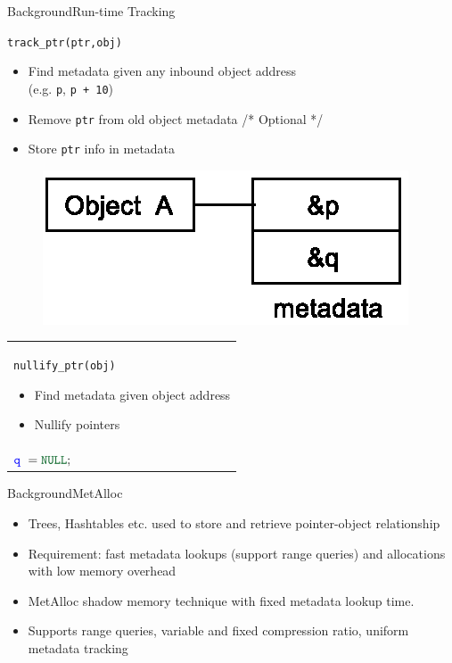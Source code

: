 \documentclass{beamer}
\begin{document}
\begin{frame}{Background}{Run-time Tracking}
\begin{minipage}{0.45\textwidth}
\texttt{\color{red}track\_ptr(ptr,obj)}
\begin{itemize}
\item Find metadata given any inbound object address \\(e.g. \texttt{\color{blue}p}, \texttt{{\color{blue}p} + 10})
\item Remove \texttt{ptr} from old object metadata /* Optional */
\item Store \texttt{ptr} info in metadata
\end{itemize}
\begin{figure}[h]
	\centering
	\includegraphics[scale=0.7]{pointer_tracking.eps} 
\end{figure}
\end{minipage}%
\hfill
\begin{minipage}{0.45\textwidth}
\begin{tabular}{|p{\textwidth}}
\texttt{\color{red}nullify\_ptr(obj)}
\begin{itemize}
\item Find metadata given object address
\item Nullify pointers
%
\end{itemize}
%
\begin{center}
$\texttt{\color{blue}p}\ = \texttt{\textcolor{darkgreen}{NULL}};$ \\
$\texttt{\color{blue}q}\ = \texttt{\textcolor{darkgreen}{NULL}};$
\end{center}
\end{tabular}
\end{minipage}%

\end{frame}

\begin{frame}{Background}{MetAlloc}
\begin{itemize}
\item Trees, Hashtables etc. used to store and retrieve pointer-object relationship
\item Requirement: fast metadata lookups (support range queries) and allocations with low memory overhead
\item MetAlloc \cite{istvan2016metalloc} shadow memory technique with fixed metadata lookup time.
\item Supports range queries, variable and fixed compression ratio, uniform metadata tracking 
\end{itemize}
\end{frame}
\end{document}
